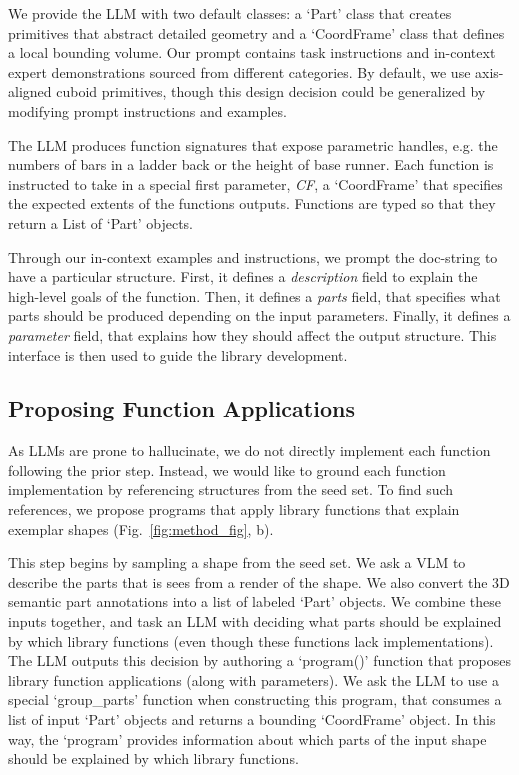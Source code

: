 We provide the LLM with two default classes: a `Part' class that creates primitives that abstract detailed geometry and a `CoordFrame' class that defines a local bounding volume.
Our prompt contains task instructions and in-context expert demonstrations sourced from different categories.
By default, we use axis-aligned cuboid primitives, though this design decision could be generalized by modifying prompt instructions and examples.

The LLM produces function signatures that expose parametric handles, e.g. the numbers of bars in a ladder back or the height of base runner.
Each function is instructed to take in a special first parameter, \textit{CF}, a `CoordFrame' that specifies the expected extents of the functions outputs. 
Functions are typed so that they return a List of `Part' objects.

Through our in-context examples and instructions, we prompt the doc-string to have a particular structure. 
First, it defines a \textit{description} field to explain the high-level goals of the function.
Then, it defines a \textit{parts} field, that specifies what parts should be produced depending on the input parameters.
Finally, it defines a \textit{parameter} field, that explains how they should affect the output structure.
This interface is then used to guide the library development.

\subsection{Proposing Function Applications}
\label{sec:prop_apps}

As LLMs are prone to hallucinate, we do not directly implement each function following the prior step. 
Instead, we would like to ground each function implementation by referencing structures from the seed set.
To find such references, we propose programs that apply library functions that explain exemplar shapes (Fig.~\ref{fig:method_fig}, b).

This step begins by sampling a shape from the seed set.
We ask a VLM to describe the parts that is sees from a render of the shape.
We also convert the 3D semantic part annotations into a list of labeled `Part' objects.
We combine these inputs together, and task an LLM with deciding what parts should be explained by which library functions (even though these functions lack implementations).
The LLM outputs this decision by authoring a `program()' function that proposes library function applications (along with parameters).
We ask the LLM to use a special `group\_parts' function when constructing this program, that consumes a list of input `Part' objects and returns a bounding `CoordFrame' object.
In this way, the `program' provides information about which parts of the input shape should be explained by which library functions.

